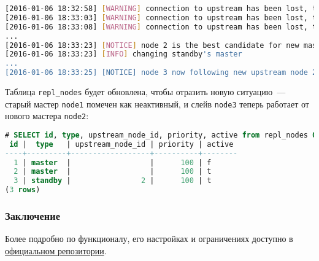 \begin{lstlisting}[language=Bash,label=lst:repmgr7,caption=Переключение слейва на новый мастер]
[2016-01-06 18:32:58] [WARNING] connection to upstream has been lost, trying to recover... 15 seconds before failover decision
[2016-01-06 18:33:03] [WARNING] connection to upstream has been lost, trying to recover... 10 seconds before failover decision
[2016-01-06 18:33:08] [WARNING] connection to upstream has been lost, trying to recover... 5 seconds before failover decision
...
[2016-01-06 18:33:23] [NOTICE] node 2 is the best candidate for new master, attempting to follow...
[2016-01-06 18:33:23] [INFO] changing standby's master
...
[2016-01-06 18:33:25] [NOTICE] node 3 now following new upstream node 2
\end{lstlisting}

Таблица \lstinline!repl_nodes! будет обновлена, чтобы отразить новую ситуацию~--- старый мастер \lstinline!node1! помечен как неактивный, и слейв \lstinline!node3! теперь работает от нового мастера \lstinline!node2!:

\begin{lstlisting}[language=SQL,label=lst:repmgr8,caption=Результат после failover]
# SELECT id, type, upstream_node_id, priority, active from repl_nodes ORDER BY id;
 id |  type   | upstream_node_id | priority | active
----+---------+------------------+----------+--------
  1 | master  |                  |      100 | f
  2 | master  |                  |      100 | t
  3 | standby |                2 |      100 | t
(3 rows)
\end{lstlisting}

\subsubsection{Заключение}

Более подробно по функционалу, его настройках и ограничениях доступно в \href{https://github.com/2ndQuadrant/repmgr/blob/master/README.md}{официальном репозитории}.
